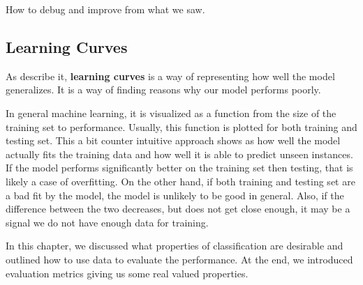 
How to debug and improve from what we saw.

\subsection{Learning Curves}

As \citet{sammut2011encyclopedia} describe it,
\textbf{learning curves} is a way of representing how well the model  generalizes.
It is a way of finding reasons why our model performs poorly.

In general machine learning, it is visualized as a function
from the size of the training set to performance.
Usually, this function is plotted for both training and testing set.
This a bit counter intuitive approach shows as how well the model
actually fits the training data and how well it is able to predict unseen instances.
If the model performs significantly better on the training set then testing,
that is likely a case of overfitting.
On the other hand, if both training and testing set are a bad fit by the model,
the model is unlikely to be good in general.
Also, if the difference between the two decreases, but does not get close enough,
it may be a signal we do not have enough data for training.




In this chapter, we discussed what properties of classification are desirable
and outlined how to use data to evaluate the performance.
At the end, we introduced evaluation metrics giving us some real valued properties.
